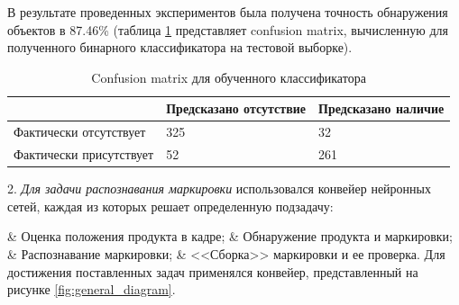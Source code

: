 \documentclass{thesisby}
\begin{document}
В результате проведенных экспериментов была получена точность обнаружения объектов в 87.46\% (таблица \ref{table:solar_detection_cm} представляет confusion matrix, вычисленную для полученного бинарного классификатора на тестовой выборке).

\begin{table}[H]
	\caption{Confusion matrix для обученного классификатора}
	\label{table:solar_detection_cm}
	\centering
	\begin{tabular}{|p{6cm}|p{4cm}|p{4cm}|}
		\hline
		& \textbf{Предсказано отсутствие} & \textbf{Предсказано наличие}\\
		\hline
	    Фактически отсутствует & 325  & 32 \\
	    \hline
		Фактически присутствует & 52 & 261 \\
		\hline
	\end{tabular}			
\end{table}	

2. \textit{Для задачи распознавания маркировки} использовался конвейер нейронных сетей, каждая из которых решает определенную подзадачу:
\begin{easylistNum}
  & Оценка положения продукта в кадре;
	& Обнаружение продукта и маркировки;
	& Распознавание маркировки;
	& <<Сборка>> маркировки и ее проверка.
	Для достижения поставленных задач применялся конвейер, представленный на рисунке \ref{fig:general_diagram}.
\end{easylistNum}
 
\end{document}
